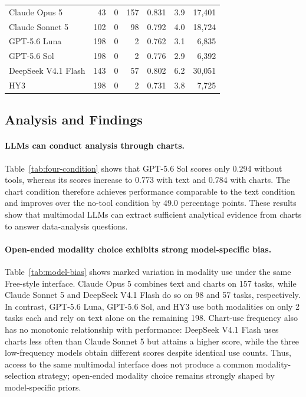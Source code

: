 \documentclass{article}
\begin{document}
\begin{table}[t]
\begin{minipage}[t]{0.62\textwidth}
{\begin{tabular}{@{}lrrrrrr@{}}
				\midrule
				Claude Opus 5 & 43 & 0 & 157 & 0.831 & 3.9 & 17{,}401 \\
				Claude Sonnet 5 & 102 & 0 & 98 & 0.792 & 4.0 & 18{,}724 \\
				GPT-5.6 Luna & 198 & 0 & 2 & 0.762 & 3.1 & 6{,}835 \\
				GPT-5.6 Sol & 198 & 0 & 2 & 0.776 & 2.9 & 6{,}392 \\
				DeepSeek V4.1 Flash & 143 & 0 & 57 & 0.802 & 6.2 & 30{,}051 \\
				HY3 & 198 & 0 & 2 & 0.731 & 3.8 & 7{,}725 \\
				\bottomrule
		\end{tabular}}
	\end{minipage}\hfill
\end{table}

\subsection{Analysis and Findings}
\label{sec:probe-findings}

\paragraph{LLMs can conduct analysis through charts.}
Table~\ref{tab:four-condition} shows that GPT-5.6 Sol scores only 0.294 without tools, whereas its scores increase to 0.773 with text and 0.784 with charts. The chart condition therefore achieves performance comparable to the text condition and improves over the no-tool condition by 49.0 percentage points. These results show that multimodal LLMs can extract sufficient analytical evidence from charts to answer data-analysis questions.

\paragraph{Open-ended modality choice exhibits strong model-specific bias.}
Table~\ref{tab:model-bias} shows marked variation in modality use under the same Free-style interface. Claude Opus 5 combines text and charts on 157 tasks, while Claude Sonnet 5 and DeepSeek V4.1 Flash do so on 98 and 57 tasks, respectively. In contrast, GPT-5.6 Luna, GPT-5.6 Sol, and HY3 use both modalities on only 2 tasks each and rely on text alone on the remaining 198. Chart-use frequency also has no monotonic relationship with performance: DeepSeek V4.1 Flash uses charts less often than Claude Sonnet 5 but attains a higher score, while the three low-frequency models obtain different scores despite identical use counts. Thus, access to the same multimodal interface does not produce a common modality-selection strategy; open-ended modality choice remains strongly shaped by model-specific priors.
\end{document}
